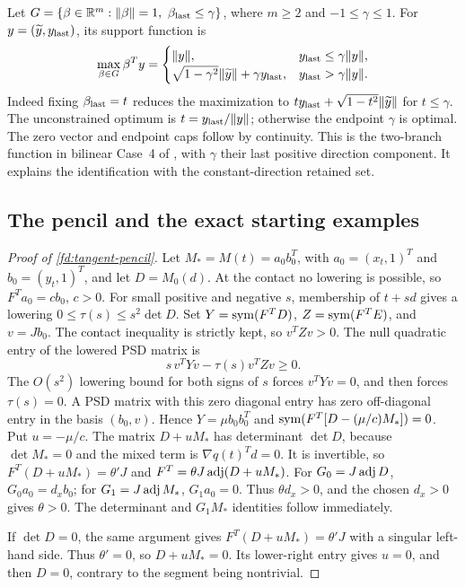 \begin{remark}\label{fd:scip-cap}
Let $G=\{\beta\in\mathbb R^m:\lVert\beta\rVert=1,\ \beta_{\rm last}\le\gamma\}$,
where $m\ge2$ and $-1\le\gamma\le1$. For $y=(\widetilde y,y_{\rm last})$,
its support function is
\[
 \max_{\beta\in G}\beta^Ty=
 \begin{cases}
 \lVert y\rVert,&y_{\rm last}\le\gamma\lVert y\rVert,\\
 \sqrt{1-\gamma^2}\lVert\widetilde y\rVert+\gamma y_{\rm last},
       &y_{\rm last}>\gamma\lVert y\rVert .
 \end{cases}
\]
Indeed fixing $\beta_{\rm last}=t$ reduces the maximization to
$t y_{\rm last}+\sqrt{1-t^2}\lVert\widetilde y\rVert$ for $t\le\gamma$.
The unconstrained optimum is $t=y_{\rm last}/\lVert y\rVert$;
otherwise the endpoint $\gamma$ is optimal. The zero vector
and endpoint caps follow by continuity. This is the two-branch
function in bilinear Case~4 of \citet{ChmielaMunozSerrano2020ZIB}, with
$\gamma$ their last positive direction component. It explains
the identification with the constant-direction retained set.
\end{remark}

\subsection{The pencil and the exact starting examples}

\begin{proof}[Proof of \cref{fd:tangent-pencil}]
\label{fd:pencil-proof}
Let $M_*=M(t)=a_0b_0^T$, with
$a_0=(x_t,1)^T$ and $b_0=(y_t,1)^T$, and let $D=M_0(d)$.
At the contact no lowering is possible, so
$F^Ta_0=c b_0$, $c>0$.
For small positive and negative $s$, membership of $t+sd$
gives a lowering $0\le\tau(s)\le s^2\det D$.
Set $Y=\operatorname{sym}(F^TD)$, $Z=\operatorname{sym}(F^TE)$, and $v=Jb_0$.
The contact inequality is strictly kept, so $v^TZv>0$.
The null quadratic entry of the lowered PSD matrix is
\[
 s\,v^TYv-\tau(s)v^TZv\ge0.
\]
The $O(s^2)$ lowering bound for both signs of $s$
forces $v^TYv=0$, and then forces $\tau(s)=0$.
A PSD matrix with this zero diagonal entry has zero
off-diagonal entry in the basis $(b_0,v)$.
Hence $Y=\mu b_0b_0^T$ and
$\operatorname{sym}(F^T[D-(\mu/c)M_*])=0$.
Put $u=-\mu/c$. The matrix $D+uM_*$ has determinant
$\det D$, because $\det M_*=0$ and the mixed term
is $\nabla q(t)^Td=0$. It is invertible, so
$F^T(D+uM_*)=\theta'J$ and
$F^T=\theta J\operatorname{adj}(D+uM_*)$.
For $G_0=J\operatorname{adj} D$,
$G_0a_0=d_xb_0$; for $G_1=J\operatorname{adj} M_*$,
$G_1a_0=0$. Thus $\theta d_x>0$, and the chosen
$d_x>0$ gives $\theta>0$.
The determinant and $G_1M_*$ identities follow immediately.

If $\det D=0$, the same argument gives
$F^T(D+uM_*)=\theta'J$ with a singular left-hand side.
Thus $\theta'=0$, so $D+uM_*=0$.
Its lower-right entry gives $u=0$, and then $D=0$,
contrary to the segment being nontrivial.
\end{proof}

